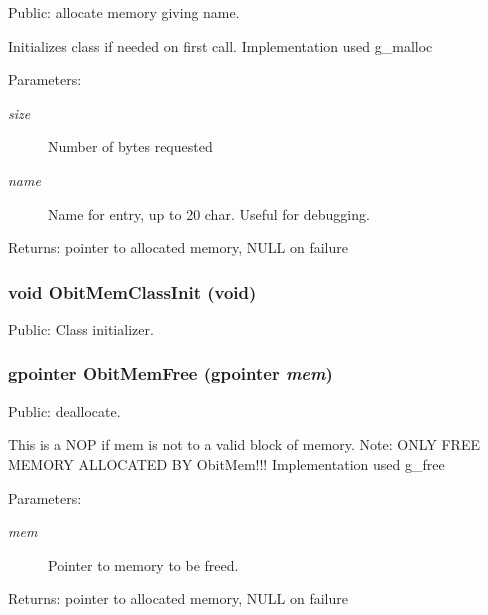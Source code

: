 Public: allocate memory giving name. 

Initializes class if needed on first call. Implementation used g\_\-malloc \begin{Desc}
\item[Parameters:]
\begin{description}
\item[{\em size}]Number of bytes requested \item[{\em name}]Name for entry, up to 20 char. Useful for debugging. \end{description}
\end{Desc}
\begin{Desc}
\item[Returns:]pointer to allocated memory, NULL on failure \end{Desc}
\subsubsection{\setlength{\rightskip}{0pt plus 5cm}void Obit\-Mem\-Class\-Init (void)}\label{ObitMem_8h_a0}


Public: Class initializer. 

\subsubsection{\setlength{\rightskip}{0pt plus 5cm}gpointer Obit\-Mem\-Free (gpointer {\em mem})}\label{ObitMem_8h_a6}


Public: deallocate. 

This is a NOP if mem is not to a valid block of memory. Note: ONLY FREE MEMORY ALLOCATED BY Obit\-Mem!!! Implementation used g\_\-free \begin{Desc}
\item[Parameters:]
\begin{description}
\item[{\em mem}]Pointer to memory to be freed. \end{description}
\end{Desc}
\begin{Desc}
\item[Returns:]pointer to allocated memory, NULL on failure \end{Desc}
